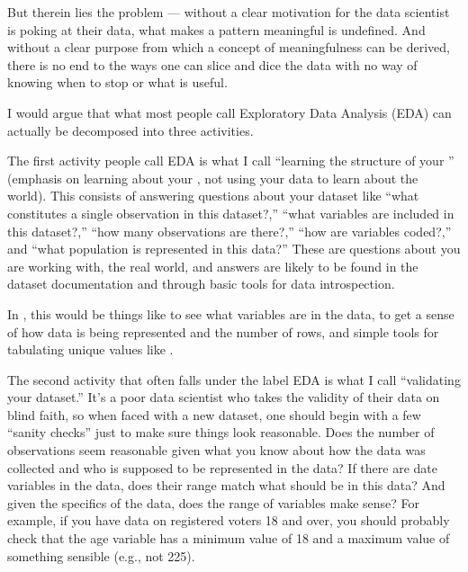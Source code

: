 \documentclass[letterpaper,10pt,english]{jupyterBook}
\begin{document}
\sphinxAtStartPar
But therein lies the problem — without a clear motivation for  the data scientist is poking at their data, what makes a pattern meaningful is undefined. And without a clear purpose from which a concept of meaningfulness can be derived, there is no end to the ways one can slice and dice the data with no way of knowing when to stop or what is useful.

\sphinxAtStartPar
I would argue that what most people call Exploratory Data Analysis (EDA) can actually be decomposed into three activities.

\sphinxAtStartPar
The first activity people call EDA is what I call “learning the structure of your ” (emphasis on learning about your , not using your data to learn about the world). This consists of answering questions about your dataset like “what constitutes a single observation in this dataset?,” “what variables are included in this dataset?,” “how many observations are there?,” “how are variables coded?,” and “what population is represented in this data?” These are questions about  you are working with,  the real world, and answers are likely to be found in the dataset documentation and through basic tools for data introspection.%
\begin{footnote}[1]\sphinxAtStartFootnote
In , this would be things like  to see what variables are in the data,  to get a sense of how data is being represented and the number of rows, and simple tools for tabulating unique values like .
%
\end{footnote}

\sphinxAtStartPar
The second activity that often falls under the label EDA is what I call “validating your dataset.” It’s a poor data scientist who takes the validity of their data on blind faith, so when faced with a new dataset, one should begin with a few “sanity checks” just to make sure things look reasonable. Does the number of observations seem reasonable given what you know about how the data was collected and who is supposed to be represented in the data? If there are date variables in the data, does their range match what should be in this data? And given the specifics of the data, does the range of variables make sense? For example, if you have data on registered voters 18 and over, you should probably check that the age variable has a minimum value of 18 and a maximum value of something sensible (e.g., not 225).
\end{document}
